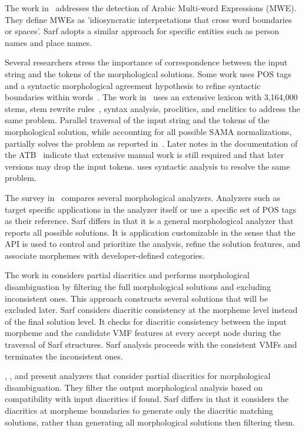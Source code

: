 The work in~\citep*{Attia:10} addresses the detection of 
Arabic Multi-word Expressions (MWE). 
They define MWEs as 'idiosyncratic interpretations 
that cross word boundaries or spaces'. 
Sarf adopts a similar approach for specific entities such as person names 
and place names. 


Several researchers stress the importance of 
correspondence
between the input string and the tokens of the morphological 
solutions. 
Some work uses POS tags and a syntactic morphological agreement
hypothesis to refine 
syntactic boundaries within words~\citep{Regina2011}.
The work in~\citep*{LIMASemmar05}\citep{ELRASemmar08}
uses an extensive lexicon 
with 3,164,000 stems, stem rewrite rules~\citep*{Darwish:02}, 
syntax analysis, proclitics, and enclitics to address the 
same problem. 
Parallel traversal of the input string and the tokens 
of the morphological solution, while accounting for all possible
SAMA normalizations, partially solves the problem as 
reported in~\citep{LRECMaamouriKB08,lrecKulickBM10}.
Later notes in the documentation of the ATB~\citep*{ATB32LDCNum}
indicate that extensive manual work is still required and that
later versions may drop the input tokens. 
\citep{Regina2011} uses syntactic analysis to resolve the same problem. 

The survey in~\citep{Sughaiyer:04} compares
several morphological analyzers. 
Analyzers such as~\citep*{Khoja:01}\citep{Darwish:02} 
target specific applications in the analyzer itself 
or use a specific set of POS tags as their reference.
Sarf differs in that it is a general morphological 
analyzer that reports all possible solutions. 
It is application customizable in the sense that the API is used to 
control and prioritize the analysis, refine the solution features, 
and associate morphemes with developer-defined categories.

The work in \citep{Chaaben:10,Attia:00,Beesley:01} 
considers partial diacritics and performs  morphological 
disambiguation by filtering the full morphological solutions 
and excluding inconsistent ones. 
This approach constructs several solutions that will be excluded later. 
Sarf considers diacritic consistency at the morpheme level instead of the final 
solution level. 
It checks for diacritic consistency %
between the input morpheme and the candidate VMF features at every 
accept node during the traversal of Sarf structures.
Sarf analysis proceeds with the consistent VMFs
and terminates the inconsistent ones.

\citep{Beesley:01}, \citep{Chaaben:10}, and \citep{Attia:00} present 
analyzers that consider partial diacritics for morphological disambiguation. 
They filter the output morphological analysis based on 
compatibility with input diacritics if found.
Sarf differs in that it considers the diacritics at morpheme boundaries 
to generate only the diacritic matching solutions, rather than 
generating all morphological solutions then filtering them.
